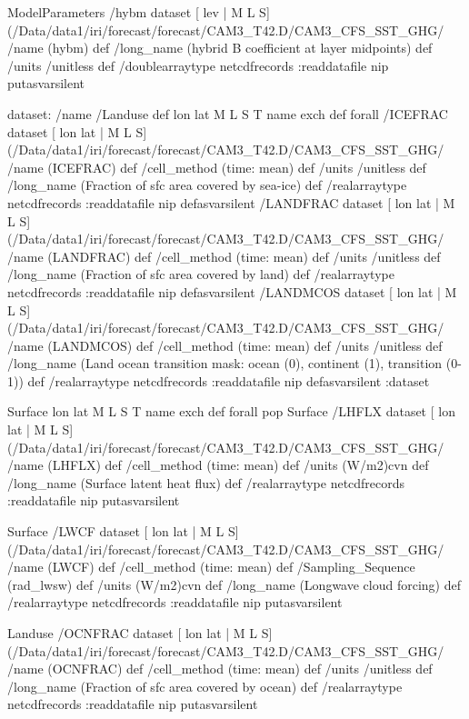 \begin{ingrid}
ModelParameters /hybm{
dataset
[ lev | M L S] (/Data/data1/iri/forecast/forecast/CAM3_T42.D/CAM3_CFS_SST_GHG/%
/name (hybm) def
 /long_name (hybrid B coefficient at layer midpoints) def
 /units /unitless def
 /doublearraytype netcdfrecords :readdatafile
nip
}putasvarsilent


dataset: /name /Landuse def
{ lon lat M L S T } { name exch def } forall
 /ICEFRAC{
dataset
[ lon lat | M L S] (/Data/data1/iri/forecast/forecast/CAM3_T42.D/CAM3_CFS_SST_GHG/%
/name (ICEFRAC) def
 /cell_method (time: mean) def
 /units /unitless def
 /long_name (Fraction of sfc area covered by sea-ice) def
 /realarraytype netcdfrecords :readdatafile
nip
}defasvarsilent
 /LANDFRAC{
dataset
[ lon lat | M L S] (/Data/data1/iri/forecast/forecast/CAM3_T42.D/CAM3_CFS_SST_GHG/%
/name (LANDFRAC) def
 /cell_method (time: mean) def
 /units /unitless def
 /long_name (Fraction of sfc area covered by land) def
 /realarraytype netcdfrecords :readdatafile
nip
}defasvarsilent
 /LANDMCOS{
dataset
[ lon lat | M L S] (/Data/data1/iri/forecast/forecast/CAM3_T42.D/CAM3_CFS_SST_GHG/%
/name (LANDMCOS) def
 /cell_method (time: mean) def
 /units /unitless def
 /long_name (Land ocean transition mask: ocean (0), continent (1), transition (0-1)) def
 /realarraytype netcdfrecords :readdatafile
nip
}defasvarsilent
:dataset

Surface { lon lat M L S T } { name exch def } forall pop
Surface /LHFLX{
dataset
[ lon lat | M L S] (/Data/data1/iri/forecast/forecast/CAM3_T42.D/CAM3_CFS_SST_GHG/%
/name (LHFLX) def
 /cell_method (time: mean) def
 /units (W/m2)cvn def
 /long_name (Surface latent heat flux) def
 /realarraytype netcdfrecords :readdatafile
nip
}putasvarsilent


Surface /LWCF{
dataset
[ lon lat | M L S] (/Data/data1/iri/forecast/forecast/CAM3_T42.D/CAM3_CFS_SST_GHG/%
/name (LWCF) def
 /cell_method (time: mean) def
 /Sampling_Sequence (rad_lwsw) def
 /units (W/m2)cvn def
 /long_name (Longwave cloud forcing) def
 /realarraytype netcdfrecords :readdatafile
nip
}putasvarsilent




Landuse /OCNFRAC{
dataset
[ lon lat | M L S] (/Data/data1/iri/forecast/forecast/CAM3_T42.D/CAM3_CFS_SST_GHG/%
/name (OCNFRAC) def
 /cell_method (time: mean) def
 /units /unitless def
 /long_name (Fraction of sfc area covered by ocean) def
 /realarraytype netcdfrecords :readdatafile
nip
}putasvarsilent


\end{ingrid}
